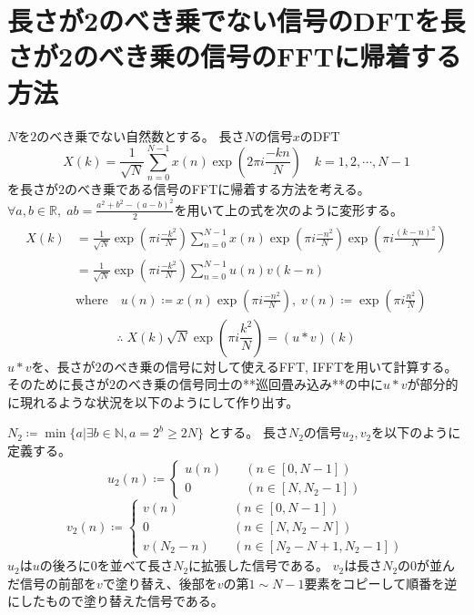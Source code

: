 			\section{長さが2のべき乗でない信号のDFTを長さが2のべき乗の信号のFFTに帰着する方法}
				$N$を$2$のべき乗でない自然数とする。
				長さ$N$の信号$x$のDFT
				\[ X(k) = \frac{1}{\sqrt{N}} \sum_{n=0}^{N-1} x(n)\exp \left(2\pi i\frac{-kn}{N}\right) \quad k=1,2,\cdots,N-1 \]
				を長さが$2$のべき乗である信号のFFTに帰着する方法を考える。
				$\forall a,b\in\mathbb{R},\;ab = \frac{a^2 + b^2 - (a-b)^2}{2}$を用いて上の式を次のように変形する。
				\begin{align*}
					\begin{aligned}
						X(k) &= \frac{1}{\sqrt{N}} \exp \left(\pi i\frac{-k^2}{N}\right) \sum_{n=0}^{N-1} x(n)\exp \left(\pi i\frac{-n^2}{N}\right) \exp \left(\pi i\frac{(k-n)^2}{N}\right) \\
						&= \frac{1}{\sqrt{N}} \exp \left(\pi i\frac{-k^2}{N}\right) \sum_{n=0}^{N-1} u(n)v(k-n) \\
						& \text{where} \quad u(n) \coloneqq x(n)\exp \left(\pi i\frac{-n^2}{N}\right),\;v(n) \coloneqq \exp \left(\pi i\frac{n^2}{N}\right)
					\end{aligned}
				\end{align*}
				\[ \therefore\; X(k)\sqrt{N} \exp \left(\pi i\frac{k^2}{N}\right) = (u*v)(k) \]
				$u*v$を、長さが$2$のべき乗の信号に対して使えるFFT, IFFTを用いて計算する。
				そのために長さが$2$のべき乗の信号同士の**巡回畳み込み**の中に$u*v$が部分的に現れるような状況を以下のようにして作り出す。
				\par
				$N_2 \coloneqq \min\{a|\exists b\in \mathbb{N}, a = 2^b \geq 2N\}$ とする。
				長さ$N_2$の信号$u_2,v_2$を以下のように定義する。
				\[
					u_2(n) \coloneqq \left\{
						\begin{aligned}
							u(n) &\quad (n \in [0,N-1]) \\
							0 &\quad (n \in [N,N_2-1])
						\end{aligned}
					\right.
				\]
				\[
					v_2(n) \coloneqq \left\{
						\begin{aligned}
							v(n) &\quad (n \in [0,N-1]) \\
							0 &\quad (n\in [N,N_2-N]) \\
							v(N_2-n) &\quad (n \in [N_2-N+1,N_2-1])
						\end{aligned}
					\right.
				\]
				$u_2$は$u$の後ろに$0$を並べて長さ$N_2$に拡張した信号である。
				$v_2$は長さ$N_2$の$0$が並んだ信号の前部を$v$で塗り替え、後部を$v$の第$1\sim N-1$要素をコピーして順番を逆にしたもので塗り替えた信号である。
